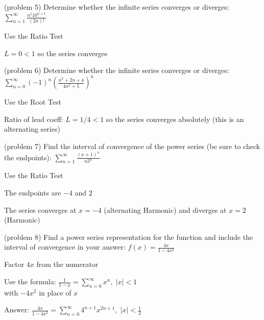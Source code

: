 \documentclass[handout]{ximera}
\begin{document}
\begin{problem}(problem 5)
Determine whether the infinite series converges or diverges: 
$\displaystyle \sum_{n=1}^\infty \frac{n^5 10^{n+1}}{(2n)!}$

\begin{hint}
Use the Ratio Test
\end{hint}

\begin{hint}
$L = 0 < 1$ so the series converges
\end{hint}

\end{problem}


\begin{problem}(problem 6)
Determine whether the infinite series converges or diverges: 
$\displaystyle \sum_{n=0}^\infty (-1)^n\left(\frac{n^2 + 2n+ 4}{4n^2 + 5}\right)^n$

\begin{hint}
Use the Root Test
\end{hint}

\begin{hint}
Ratio of lead coeff: $L = 1/4 < 1$ so the series converges absolutely (this is an alternating series)
\end{hint}

\end{problem}

\begin{problem} (problem 7)
Find the interval of convergence of the power series (be sure to check the endpoints):
$\displaystyle \sum_{n=1}^\infty \frac{(x + 1)^n}{n 3^n}$

\begin{hint}
Use the Ratio Test
\end{hint}
\begin{hint}
The endpoints are $-4$ and $2$
\end{hint}
\begin{hint}
The series converges at $x = -4$ (alternating Harmonic) and diverges at $x = 2$ (Harmonic)
\end{hint}

\end{problem}


\begin{problem} (problem 8)
Find a power series representation for the function and include the interval of convergence in your answer:
$\displaystyle f(x) = \frac{4x}{1 - 4x^2}$

\begin{hint}
Factor $4x$ from the numerator
\end{hint}
\begin{hint}
Use the formula: $\displaystyle \frac{1}{1-x} = \sum_{n = 0}^\infty x^n, \; |x| <1$\\
with $-4x^2$ in place of $x$
\end{hint}

\begin{hint}
Answer: 
$\displaystyle \frac{4x}{1-4x^2} = \sum_{n = 0}^\infty 4^{n+1}x^{2n+1} , \; |x| <\frac12$
\end{hint}

\end{problem}
\end{document}
